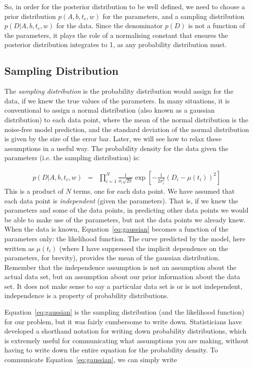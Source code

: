 So, in order for the posterior distribution to be well defined, we need to
choose a prior distribution $p(A, b, t_c, w)$ for the parameters, and a
sampling distribution $p(D | A, b, t_c, w)$ for the data. Since the denominator
$p(D)$ is not a function of the parameters, it plays the role of a normalising
constant that ensures the posterior distribution integrates to 1, as any
probability distribution must.

\subsection{Sampling Distribution}
The {\it sampling distribution} is the probability distribution would assign
for the data, if we knew the true values of the parameters.
In many situations, it is conventional to assign a normal distribution
(also known as a gaussian distribution) to each data point, where the mean
of the normal distribution is the noise-free model prediction, and the
standard deviation of the normal distribution is given by the size of the
error bar. Later, we will see how to relax these assumptions in a useful way.
The probability density for the data given the parameters (i.e. the sampling
distribution) is:

\begin{eqnarray}
p(D | A, b, t_c, w) &=& \prod_{i=1}^N \frac{1}{\sigma_i \sqrt{2\pi}}
\exp\left[-\frac{1}{2\sigma_i^2}\left(D_i - \mu(t_i)\right)^2\right]\label{eq:gaussian}
\end{eqnarray}
This is a product of $N$ terms, one for each data point. We have assumed that
each data point is {\it independent} (given the parameters). That is, if we
knew the parameters and some of the data points, in predicting other data points
we would be able to make use of the parameters, but not the data points we
already knew. When the data is known, Equation~\ref{eq:gaussian} becomes a
function of the parameters only: the likelihood function. The curve predicted
by the model, here written as $\mu(t_i)$ (where I have suppressed the implicit
dependence on the parameters, for brevity), provides the mean of the gaussian
distribution. Remember that the independence assumption is not an assumption
about the actual data set, but an assumption
about our prior information about the data set. It does not make sense to say
a particular data set is or is not independent, independence is a property of
probability distributions.

Equation~\ref{eq:gaussian} is the sampling distribution
(and the likelihood function) for our problem, but it
was fairly cumbersome to write down. Statisticians have developed a shorthand
notation for writing down probability distributions, which is extremely useful
for communicating what assumptions you are making, without having to write down
the entire equation for the probability density. To communicate
Equation~\ref{eq:gaussian}, we can simply write


